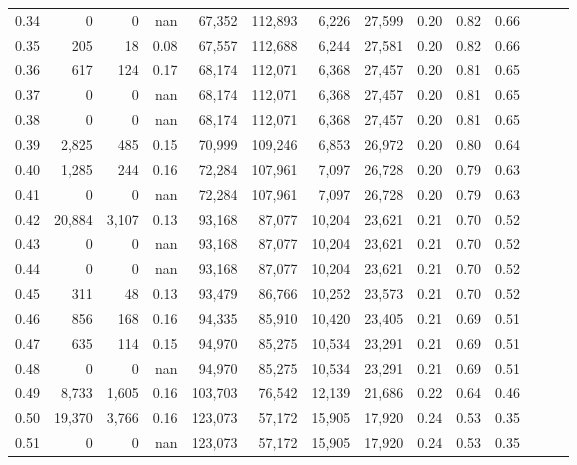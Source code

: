 \begin{tabular}{rrrrrrrrrrrrrr}
0.34 &       0 &      0 &   nan &   67,352 &  112,893 &   6,226 &  27,599 &  0.20 &  0.82 &      0.66 \\
0.35 &     205 &     18 &  0.08 &   67,557 &  112,688 &   6,244 &  27,581 &  0.20 &  0.82 &      0.66 \\
0.36 &     617 &    124 &  0.17 &   68,174 &  112,071 &   6,368 &  27,457 &  0.20 &  0.81 &      0.65 \\
0.37 &       0 &      0 &   nan &   68,174 &  112,071 &   6,368 &  27,457 &  0.20 &  0.81 &      0.65 \\
0.38 &       0 &      0 &   nan &   68,174 &  112,071 &   6,368 &  27,457 &  0.20 &  0.81 &      0.65 \\
0.39 &   2,825 &    485 &  0.15 &   70,999 &  109,246 &   6,853 &  26,972 &  0.20 &  0.80 &      0.64 \\
0.40 &   1,285 &    244 &  0.16 &   72,284 &  107,961 &   7,097 &  26,728 &  0.20 &  0.79 &      0.63 \\
0.41 &       0 &      0 &   nan &   72,284 &  107,961 &   7,097 &  26,728 &  0.20 &  0.79 &      0.63 \\
0.42 &  20,884 &  3,107 &  0.13 &   93,168 &   87,077 &  10,204 &  23,621 &  0.21 &  0.70 &      0.52 \\
0.43 &       0 &      0 &   nan &   93,168 &   87,077 &  10,204 &  23,621 &  0.21 &  0.70 &      0.52 \\
0.44 &       0 &      0 &   nan &   93,168 &   87,077 &  10,204 &  23,621 &  0.21 &  0.70 &      0.52 \\
0.45 &     311 &     48 &  0.13 &   93,479 &   86,766 &  10,252 &  23,573 &  0.21 &  0.70 &      0.52 \\
0.46 &     856 &    168 &  0.16 &   94,335 &   85,910 &  10,420 &  23,405 &  0.21 &  0.69 &      0.51 \\
0.47 &     635 &    114 &  0.15 &   94,970 &   85,275 &  10,534 &  23,291 &  0.21 &  0.69 &      0.51 \\
0.48 &       0 &      0 &   nan &   94,970 &   85,275 &  10,534 &  23,291 &  0.21 &  0.69 &      0.51 \\
0.49 &   8,733 &  1,605 &  0.16 &  103,703 &   76,542 &  12,139 &  21,686 &  0.22 &  0.64 &      0.46 \\
0.50 &  19,370 &  3,766 &  0.16 &  123,073 &   57,172 &  15,905 &  17,920 &  0.24 &  0.53 &      0.35 \\
0.51 &       0 &      0 &   nan &  123,073 &   57,172 &  15,905 &  17,920 &  0.24 &  0.53 &      0.35 \\

\end{tabular}
